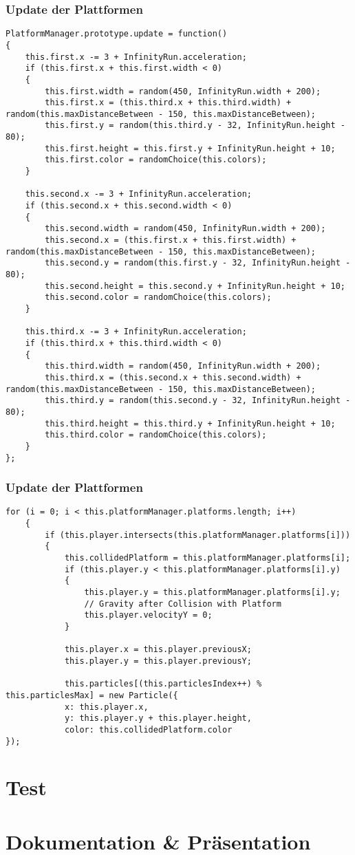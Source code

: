 \subsubsection{Update der Plattformen}
\lstset{language=java}
\begin{lstlisting}[frame=single]
PlatformManager.prototype.update = function() 
{
	this.first.x -= 3 + InfinityRun.acceleration;
	if (this.first.x + this.first.width < 0) 
	{
		this.first.width = random(450, InfinityRun.width + 200);
		this.first.x = (this.third.x + this.third.width) + random(this.maxDistanceBetween - 150, this.maxDistanceBetween);
		this.first.y = random(this.third.y - 32, InfinityRun.height - 80);
		this.first.height = this.first.y + InfinityRun.height + 10;
		this.first.color = randomChoice(this.colors);
	}

	this.second.x -= 3 + InfinityRun.acceleration;
	if (this.second.x + this.second.width < 0) 
	{
		this.second.width = random(450, InfinityRun.width + 200);
		this.second.x = (this.first.x + this.first.width) + random(this.maxDistanceBetween - 150, this.maxDistanceBetween);
		this.second.y = random(this.first.y - 32, InfinityRun.height - 80);
		this.second.height = this.second.y + InfinityRun.height + 10;
		this.second.color = randomChoice(this.colors);
	}

	this.third.x -= 3 + InfinityRun.acceleration;
	if (this.third.x + this.third.width < 0) 
	{
		this.third.width = random(450, InfinityRun.width + 200);
		this.third.x = (this.second.x + this.second.width) + random(this.maxDistanceBetween - 150, this.maxDistanceBetween);
		this.third.y = random(this.second.y - 32, InfinityRun.height - 80);
		this.third.height = this.third.y + InfinityRun.height + 10;
		this.third.color = randomChoice(this.colors);
	}
};
\end{lstlisting}
\subsubsection{Update der Plattformen}
\lstset{language=java}
\begin{lstlisting}[frame=single]
    for (i = 0; i < this.platformManager.platforms.length; i++) 
    {
		if (this.player.intersects(this.platformManager.platforms[i])) 
		{
			this.collidedPlatform = this.platformManager.platforms[i];
			if (this.player.y < this.platformManager.platforms[i].y) 
			{
				this.player.y = this.platformManager.platforms[i].y;
				// Gravity after Collision with Platform
				this.player.velocityY = 0;
			}

			this.player.x = this.player.previousX;
			this.player.y = this.player.previousY;
			
			this.particles[(this.particlesIndex++) % this.particlesMax] = new Particle({
			x: this.player.x,
			y: this.player.y + this.player.height,
			color: this.collidedPlatform.color
});
\end{lstlisting}
\section{Test}
\section{Dokumentation \& Pr\"asentation}

